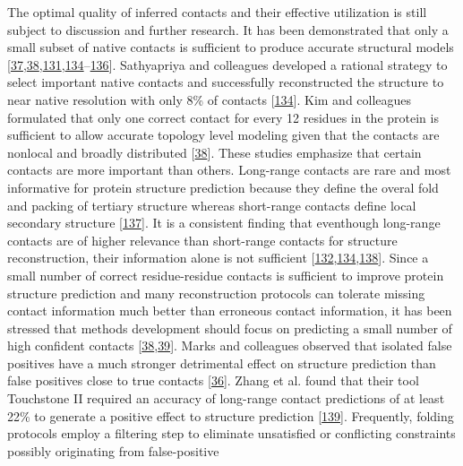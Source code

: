 \documentclass[11pt,a4paper,twoside]{book}
\theoremstyle{definition}
\theoremstyle{definition}
\theoremstyle{remark}
\begin{document}
The optimal quality of inferred contacts and their effective utilization
is still subject to discussion and further research. It has been
demonstrated that only a small subset of native contacts is sufficient
to produce accurate structural models
{[}\protect\hyperlink{ref-Vendruscolo1997}{37},\protect\hyperlink{ref-Kim2014}{38},\protect\hyperlink{ref-Konopka2014}{131},\protect\hyperlink{ref-Sathyapriya2009}{134}--\protect\hyperlink{ref-Vassura2007}{136}{]}.
Sathyapriya and colleagues developed a rational strategy to select
important native contacts and successfully reconstructed the structure
to near native resolution with only 8\% of contacts
{[}\protect\hyperlink{ref-Sathyapriya2009}{134}{]}. Kim and colleagues
formulated that only one correct contact for every 12 residues in the
protein is sufficient to allow accurate topology level modeling given
that the contacts are nonlocal and broadly distributed
{[}\protect\hyperlink{ref-Kim2014}{38}{]}. These studies emphasize that
certain contacts are more important than others. Long-range contacts are
rare and most informative for protein structure prediction because they
define the overal fold and packing of tertiary structure whereas
short-range contacts define local secondary structure
{[}\protect\hyperlink{ref-Adhikari2017}{137}{]}. It is a consistent
finding that eventhough long-range contacts are of higher relevance than
short-range contacts for structure reconstruction, their information
alone is not sufficient
{[}\protect\hyperlink{ref-Kosciolek2014}{132},\protect\hyperlink{ref-Sathyapriya2009}{134},\protect\hyperlink{ref-DiLena2009a}{138}{]}.
Since a small number of correct residue-residue contacts is sufficient
to improve protein structure prediction and many reconstruction
protocols can tolerate missing contact information much better than
erroneous contact information, it has been stressed that methods
development should focus on predicting a small number of high confident
contacts
{[}\protect\hyperlink{ref-Kim2014}{38},\protect\hyperlink{ref-Duarte2010}{39}{]}.
Marks and colleagues observed that isolated false positives have a much
stronger detrimental effect on structure prediction than false positives
close to true contacts {[}\protect\hyperlink{ref-Marks2011}{36}{]}.
Zhang et al. found that their tool Touchstone II required an accuracy of
long-range contact predictions of at least 22\% to generate a positive
effect to structure prediction
{[}\protect\hyperlink{ref-Zhang2003}{139}{]}. Frequently, folding
protocols employ a filtering step to eliminate unsatisfied or
conflicting constraints possibly originating from false-positive
\end{document}
